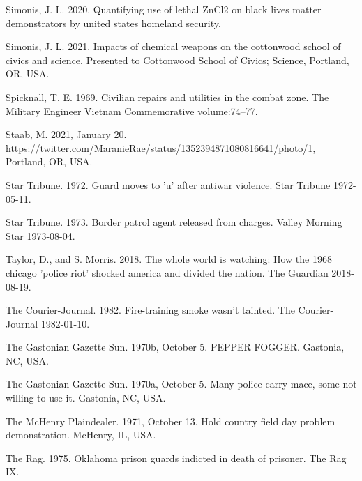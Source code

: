 \documentclass[
  11pt,
]{krantz}
\newlength{\cslhangindent}
\newlength{\cslentryspacingunit} %
\newenvironment{CSLReferences}[2] %
 {%
  \setlength{\parindent}{0pt}
  \ifodd #1
  \let\oldpar\par
  \def\par{\hangindent=\cslhangindent\oldpar}
  \fi
  \setlength{\parskip}{#2\cslentryspacingunit}
 }%
 {}
\begin{document}
\begin{CSLReferences}{1}{0}
\leavevmode{}%
Simonis, J. L. 2020. Quantifying use of lethal ZnCl2 on black lives matter demonstrators by united states homeland security.

\leavevmode{}%
Simonis, J. L. 2021. Impacts of chemical weapons on the cottonwood school of civics and science. Presented to Cottonwood School of Civics; Science, Portland, OR, USA.

\leavevmode{}%
Spicknall, T. E. 1969. Civilian repairs and utilities in the combat zone. The Military Engineer Vietnam Commemorative volume:74--77.

\leavevmode{}%
Staab, M. 2021, January 20. \url{https://twitter.com/MaranieRae/status/1352394871080816641/photo/1}, Portland, OR, USA.

\leavevmode{}%
Star Tribune. 1972. Guard moves to 'u' after antiwar violence. Star Tribune 1972-05-11.

\leavevmode{}%
Star Tribune. 1973. Border patrol agent released from charges. Valley Morning Star 1973-08-04.

\leavevmode{}%
Taylor, D., and S. Morris. 2018. The whole world is watching: How the 1968 chicago 'police riot' shocked america and divided the nation. The Guardian 2018-08-19.

\leavevmode{}%
The Courier-Journal. 1982. Fire-training smoke wasn't tainted. The Courier-Journal 1982-01-10.

\leavevmode{}%
The Gastonian Gazette Sun. 1970b, October 5. PEPPER FOGGER. Gastonia, NC, USA.

\leavevmode{}%
The Gastonian Gazette Sun. 1970a, October 5. Many police carry mace, some not willing to use it. Gastonia, NC, USA.

\leavevmode{}%
The McHenry Plaindealer. 1971, October 13. Hold country field day problem demonstration. McHenry, IL, USA.

\leavevmode{}%
The Rag. 1975. Oklahoma prison guards indicted in death of prisoner. The Rag IX.


\end{CSLReferences}
\end{document}
